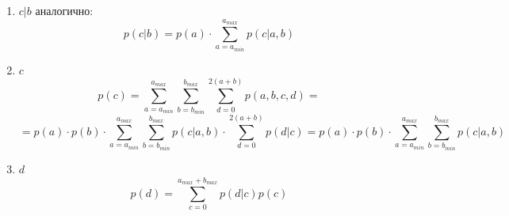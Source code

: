 \documentclass[12pt,a4paper,oneside,fleqn,leqno]{article}
\begin{document}
\begin{enumerate}
				\item $c|b$ аналогично:
				$$p(c|b) = p(a) \cdot \sum\limits_{a = a_{min}}^{a_{max}} p(c|a, b)$$
				\item $c$
						$$p(c) = \sum\limits_{a = a_{min}}^{a_{max}} \sum\limits_{b = b_{min}}^{b_{max}} \sum\limits_{d = 0}^{2(a + b)} p(a, b, c, d) =$$ 
						$$ = p(a) \cdot p(b) \cdot \sum\limits_{a = a_{min}}^{a_{max}} \sum\limits_{b = b_{min}}^{b_{max}} p(c|a,b) \cdot \sum\limits_{d = 0}^{2(a + b)} p(d|c) = p(a)\cdot p(b) \cdot  \sum\limits_{a = a_{min}}^{a_{max}} \sum\limits_{b = b_{min}}^{b_{max}} p(c|a,b)$$
				\item $d$
				$$ p(d) = \sum\limits_{c = 0}^{a_{max} + b_{max}}p(d|c)p(c)$$
			\end{enumerate}
\end{document}
